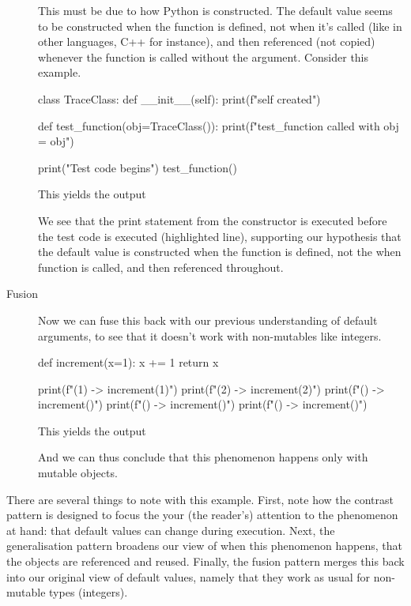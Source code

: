 \begin{description}
    This must be due to how Python is constructed.
    The default value seems to be constructed when the function is defined, not 
    when it's called (like in other languages, C++ for instance), and then 
    referenced (not copied) whenever the function is called without the 
    argument.
    Consider this example.

    \begin{pyblock}[default1][highlightlines=5]
class TraceClass:
  def __init__(self):
    print(f"{self} created")

def test_function(obj=TraceClass()):
  print(f"test_function called with obj = {obj}")

print("Test code begins")
test_function()
    \end{pyblock}
    This yields the output
    \printpythontex[verbatim][highlightlines={1}]

    We see that the print statement from the constructor is executed before the 
    test code is executed (highlighted line), supporting our hypothesis that 
    the default value is constructed when the function is defined, not the when 
    function is called, and then referenced throughout.

  \item[Fusion] Now we can fuse this back with our previous understanding of 
    default arguments, to see that it doesn't work with non-mutables like 
    integers.
    \begin{pyblock}[default1]
def increment(x=1):
  x += 1
  return x

print(f"(1) -> {increment(1)}")
print(f"(2) -> {increment(2)}")
print(f"()  -> {increment()}")
print(f"()  -> {increment()}")
print(f"()  -> {increment()}")
    \end{pyblock}
    This yields the output
    \printpythontex[verbatim][highlightlines={3-5}]

    And we can thus conclude that this phenomenon happens only with mutable 
    objects.
\end{description}

There are several things to note with this example.
First, note how the contrast pattern is designed to focus the your (the 
reader's) attention to the phenomenon at hand: that default values can change 
during execution.
Next, the generalisation pattern broadens our view of when this phenomenon 
happens, that the objects are referenced and reused.
Finally, the fusion pattern merges this back into our original view of default 
values, namely that they work as usual for non-mutable types (\eg integers).

